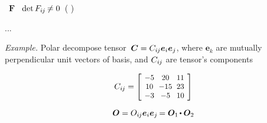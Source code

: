 
\label{para:polardecomposition}

 ~${\bm{F}}$ ~${\operatorname{det} F_{i\hspace{-0.1ex}j} \hspace{-0.2ex} \neq 0}$~( )   

...

\begin{tcolorbox}
\small\setlength{\abovedisplayskip}{2pt}\setlength{\belowdisplayskip}{2pt}

\emph{Example.} Polar decompose tensor~${\bm{C} = C_{i\hspace{-0.1ex}j} \bm{e}_i \bm{e}_j}$, where $\bm{e}_k$ are mutually perpendicular unit vectors of basis, and $C_{i\hspace{-0.1ex}j}$ are tensor’s components

\begin{equation*}
C_{i\hspace{-0.1ex}j} =
\scalebox{0.92}[0.92]{$\left[\hspace{-0.2ex}\begin{array}{c@{\hspace{.6em}}c@{\hspace{.6em}}c}
-5 & 20 & 11 \\
10 & -15 & 23 \\
-3 & -5 & 10
\end{array}\hspace{-0.2ex}\right]$}
\end{equation*}

\begin{equation*}
\rotationtensor = O_{i\hspace{-0.1ex}j} \bm{e}_i \bm{e}_j \hspace{-0.2ex}
= \bm{O}_1 \hspace{-0.2ex} \dotp \bm{O}_2
\end{equation*}


\end{tcolorbox}
